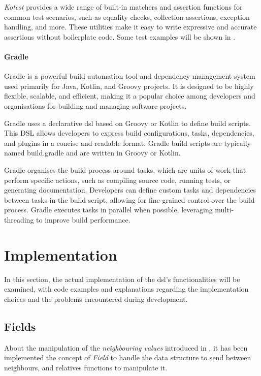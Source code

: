 \emph{Kotest} provides a wide range of built-in matchers and assertion functions for common test scenarios, such as equality
checks, collection assertions, exception handling, and more.
These utilities make it easy to write expressive and accurate assertions without boilerplate code.
Some test examples will be shown in .

\paragraph{Gradle}
Gradle is a powerful build automation tool and dependency management system used primarily for Java, Kotlin, and Groovy projects.
It is designed to be highly flexible, scalable, and efficient, making it a popular choice among developers and
organisations for building and managing software projects.

Gradle uses a declarative \ac{dsl} based on Groovy or Kotlin to define build scripts.
This DSL allows developers to express build configurations, tasks, dependencies, and plugins in a concise and readable format.
Gradle build scripts are typically named build.gradle and are written in Groovy or Kotlin.

Gradle organises the build process around tasks, which are units of work that perform specific actions, such as compiling
source code, running tests, or generating documentation.
Developers can define custom tasks and dependencies between tasks in the build script, allowing for fine-grained control over the build process.
Gradle executes tasks in parallel when possible, leveraging multi-threading to improve build performance.

\section{Implementation}
\label{sec:implementation}
In this section, the actual implementation of the \ac{dsl}'s functionalities will be examined, with code examples and explanations
regarding the implementation choices and the problems encountered during development.

\subsection{Fields}
\label{subsec:fields}
About the manipulation of the \emph{neighbouring values} introduced in , it has been implemented
the concept of \emph{Field} to handle the data structure to send between neighbours, and relatives functions to manipulate it.

